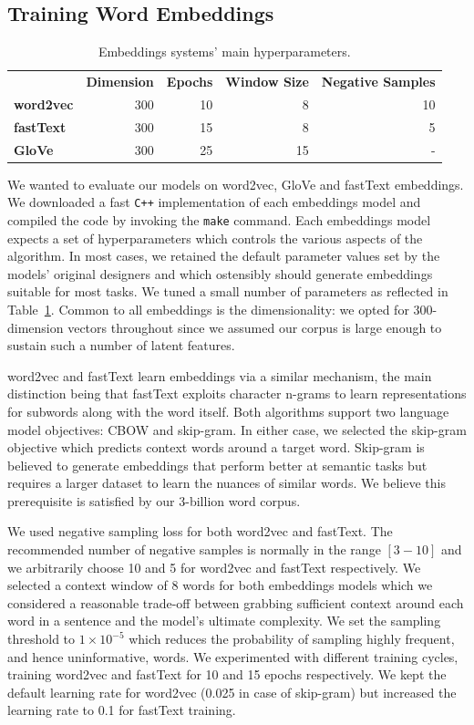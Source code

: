 \subsection{Training Word Embeddings}
\begin{table}\centering
    \begin{tabular}{@{}lrrrr@{}} \toprule
    & \textbf{Dimension} & \textbf{Epochs} & \textbf{Window Size} & \textbf{Negative Samples} \\ \cmidrule{2-5}
    \textbf{word2vec} & 300 & 10 & 8 & 10 \\  
    \textbf{fastText} & 300 & 15 & 8 & 5 \\
    \textbf{GloVe} & 300 & 25 & 15 & - \\
    \bottomrule
    \end{tabular}
    \caption{Embeddings systems' main hyperparameters.}\label{tab:semeval_embeddings_hyper}
\end{table}
We wanted to evaluate our models on word2vec, GloVe and fastText embeddings.  We downloaded a fast \texttt{C++} implementation of each embeddings model and compiled the code by invoking the \texttt{make} command.  Each embeddings model expects a set of hyperparameters which controls the various aspects of the algorithm.  In most cases, we retained the default parameter values set by the models' original designers and which ostensibly should generate embeddings suitable for most tasks.  We tuned a small number of parameters as reflected in Table~\ref{tab:semeval_embeddings_hyper}.  Common to all embeddings is the dimensionality: we opted for 300-dimension vectors throughout since we assumed our corpus is large enough to sustain such a number of latent features.

word2vec and fastText learn embeddings via a similar mechanism, the main distinction being that fastText exploits character n-grams to learn representations for subwords along with the word itself.  Both algorithms support two language model objectives: \ac{CBOW} and skip-gram.  In either case, we selected the skip-gram objective which predicts context words around a target word.  Skip-gram is believed to generate embeddings that perform better at semantic tasks \citep{mikolov2013distributed} but requires a larger dataset to learn the nuances of similar words.  We believe this prerequisite is satisfied by our 3-billion word corpus.  

We used negative sampling loss for both word2vec and fastText.  The recommended number of negative samples is normally in the range $[3-10]$ and we arbitrarily choose 10 and 5 for word2vec and fastText respectively.  We selected a context window of 8 words for both embeddings models which we considered a  reasonable trade-off between grabbing sufficient context around each word in a sentence and the model's ultimate complexity.  We set the sampling threshold to $1\times10^{-5}$ which reduces the probability of sampling highly frequent, and hence uninformative, words.  We experimented with different training cycles, training word2vec and fastText for 10 and 15 epochs respectively.  We kept the default learning rate for word2vec (0.025 in case of skip-gram) but increased the learning rate to 0.1 for fastText training.  

